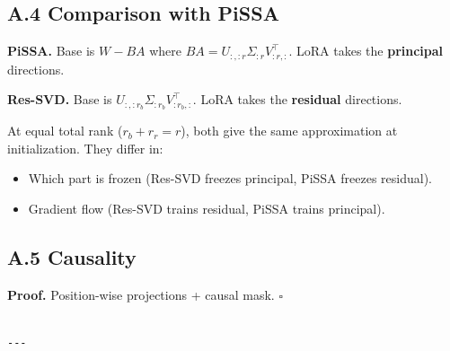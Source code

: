 \subsection{A.4 Comparison with PiSSA}

\textbf{PiSSA.} Base is $W - BA$ where $BA = U_{:, :r} \Sigma_{:r} V_{:r, :}^\top$. 
LoRA takes the \textbf{principal} directions.

\textbf{Res-SVD.} Base is $U_{:, :r_b} \Sigma_{:r_b} V_{:r_b, :}^\top$. LoRA 
takes the \textbf{residual} directions.

At equal total rank ($r_b + r_r = r$), both give the same approximation 
at initialization. They differ in:
\begin{itemize}
\item Which part is frozen (Res-SVD freezes principal, PiSSA freezes residual).
\item Gradient flow (Res-SVD trains residual, PiSSA trains principal).

\end{itemize}
\subsection{A.5 Causality}

\textbf{Proof.} Position-wise projections + causal mask. $\square$
\begin{lstlisting}

---
\end{lstlisting}